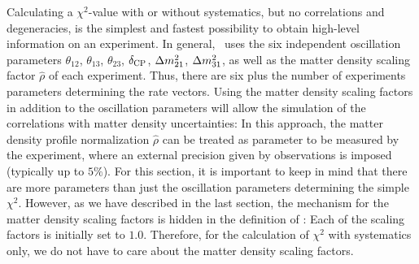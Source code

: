 Calculating a $\chi^2$-value with or without systematics, but no correlations and degeneracies, is the simplest and fastest possibility to obtain high-level information on an experiment. In general, \GLOBES\ uses the six independent oscillation parameters $\theta_{12}$, $\theta_{13}$, $\theta_{23}$, $\delta_{\mathrm{CP}}$, $\Delta m_{21}^2$, $\Delta m_{31}^2$, as well as the matter density 
scaling factor $\hat{\rho}$ of each experiment. Thus, there are six plus the number of experiments parameters determining the rate vectors. Using the matter density scaling factors  in addition to the oscillation parameters will allow the simulation of the correlations with matter density uncertainties: In this
approach, the matter density profile normalization $\hat{\rho}$ can 
be treated
as parameter to be measured by the experiment, where an external precision
given by observations is imposed (typically up to $5\%$). 
 For this section, it is important to keep in mind
that there are more parameters than just the oscillation parameters
determining the simple $\chi^2$. However, as we have described in the
last section, the mechanism for the matter density scaling factors
is hidden in the definition of : Each of the scaling
factors is initially set to $1.0$. Therefore, for the calculation of
$\chi^2$ with systematics only, we do not have to care about the
matter density scaling factors.

